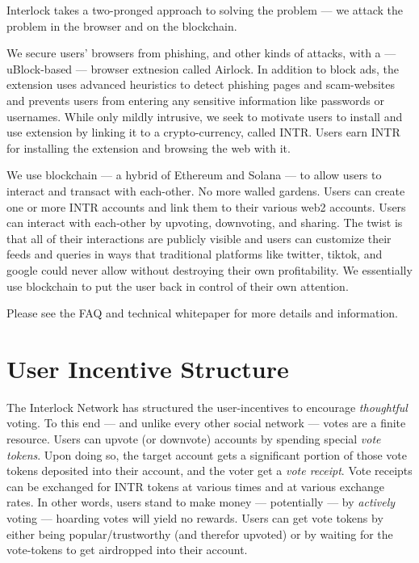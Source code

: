 \documentclass[a4paper]{article}
\begin{document}
Interlock takes a two-pronged approach to solving the problem ---  we attack the problem in the browser and on the blockchain.

We secure users' browsers from phishing, and other kinds of attacks, with a ---  uBlock-based ---  browser extnesion called Airlock. In addition to block ads, the extension uses advanced heuristics to detect phishing pages and scam-websites and prevents users from entering any sensitive information like passwords or usernames. While only mildly intrusive, we seek to motivate users to install and use extension by linking it to a crypto-currency, called INTR. Users earn INTR for installing the extension and browsing the web with it.

We use blockchain ---  a hybrid of Ethereum and Solana ---  to allow users to interact and transact with each-other. No more walled gardens. Users can create one or more INTR accounts and link them to their various web2 accounts. Users can interact with each-other by upvoting, downvoting, and sharing. The twist is that all of their interactions are publicly visible and users can customize their feeds and queries in ways that traditional platforms like twitter, tiktok, and google could never allow without destroying their own profitability. We essentially use blockchain to put the user back in control of their own attention.

Please see the FAQ and technical whitepaper for more details and information.
\section{User Incentive Structure}
\label{User Incentive Structure}

The Interlock Network has structured the user-incentives to encourage \emph{thoughtful} voting. To this end ---  and unlike every other social network ---  votes are a finite resource. Users can upvote (or downvote) accounts by spending special \emph{vote tokens}. Upon doing so, the target account gets a significant portion of those vote tokens deposited into their account, and the voter get a \emph{vote receipt}. Vote receipts can be exchanged for INTR tokens at various times and at various exchange rates. In other words, users stand to make money ---  potentially ---  by \emph{actively} voting ---  hoarding votes will yield no rewards. Users can get vote tokens by either being popular/trustworthy (and therefor upvoted) or by waiting for the vote-tokens to get airdropped into their account.
\end{document}
